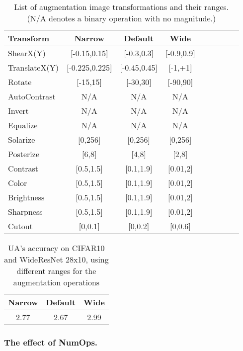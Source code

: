 \documentclass[runningheads]{llncs}
\begin{document}
	\begin{table} [htb]
		\begin{center}
			\caption{List of augmentation image transformations and their ranges. (N/A denotes a binary operation with no magnitude.)}
			\label{table:augrange}
			\begin{tabular}{l | cccccccl}
				\hline Transform & Narrow & Default  & Wide \\
\hline \hline \small ShearX(Y) &  [-0.15,0.15] & [-0.3,0.3] & [-0.9,0.9] \\
				\small TranslateX(Y) & [-0.225,0.225] & [-0.45,0.45] & [-1,+1]\\
				\small Rotate & [-15,15] & [-30,30] & [-90,90] \\
				\small AutoContrast & N/A & N/A & N/A \\
				\small Invert & N/A & N/A & N/A \\
				\small Equalize & N/A & N/A & N/A \\
				\small Solarize & [0,256] & [0,256] & [0,256] \\
				\small Posterize & [6,8] & [4,8] & [2,8] \\
				\small Contrast & [0.5,1.5] & [0.1,1.9] & [0.01,2] \\
				\small Color & [0.5,1.5] & [0.1,1.9] & [0.01,2] \\
				\small Brightness & [0.5,1.5] & [0.1,1.9] & [0.01,2] \\
				\small Sharpness & [0.5,1.5] & [0.1,1.9] & [0.01,2] \\
				\small Cutout & [0,0.1] & [0,0.2] & [0,0.6] \\
\hline
			\end{tabular}
		\end{center}
	\end{table}
	
	\begin{table} [htb]
		\begin{center}
			\caption{UA's accuracy on CIFAR10 and WideResNet 28x10, using different ranges for the augmentation operations}
			\label{table:augrange-results}
			\begin{tabular}{ccc}
				\hline
				Narrow & Default  & Wide \\
				\hline \hline
				2.77 & 2.67 & 2.99 \\
				\hline
			\end{tabular}
		\end{center}
	\end{table}
	
	
	\subsubsection{The effect of NumOps.} 
	
\end{document}
